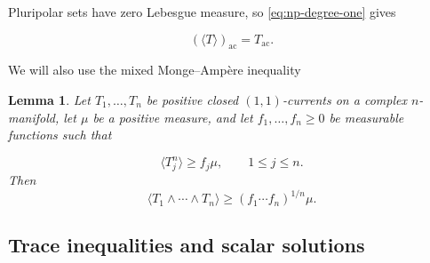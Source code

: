 \documentclass[reqno]{amsart}
\numberwithin{equation}{section}
\newtheorem{lemma}[theorem]{Lemma}
\theoremstyle{definition}
\begin{document}
Pluripolar sets have zero Lebesgue measure, so \eqref{eq:np-degree-one} gives

\begin{equation}\label{eq:ac-degree-one}
(\langle T\rangle)_{\mathrm{ac}}=T_{\mathrm{ac}}.
\end{equation}

We will also use the mixed Monge--Amp\`ere inequality \cite[Proposition 1.11]{BEGZ10} \begin{lemma}\label{lem:mixed-ma}
Let $T_1,\ldots,T_n$ be positive closed $(1,1)$-currents on a complex $n$-manifold, let $\mu$ be a positive measure, and let $f_1,\ldots,f_n\geq0$ be measurable functions such that

\[
\langle T_j^n\rangle\geq f_j\mu,\qquad 1\leq j\leq n.
\]
Then
\begin{equation}\label{eq:mixed-ma}
\langle T_1\wedge\cdots\wedge T_n\rangle
\geq(f_1\cdots f_n)^{1/n}\mu.
\end{equation}
\end{lemma}

\subsection{Trace inequalities and scalar solutions}
\end{document}
